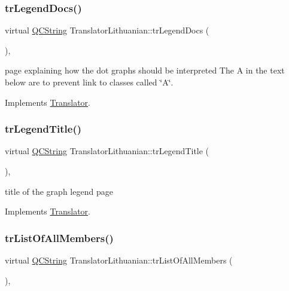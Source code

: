 \subsubsection{\texorpdfstring{trLegendDocs()}{trLegendDocs()}}
{\footnotesize\ttfamily virtual \mbox{\hyperlink{class_q_c_string}{Q\+C\+String}} Translator\+Lithuanian\+::tr\+Legend\+Docs (\begin{DoxyParamCaption}{ }\end{DoxyParamCaption})\hspace{0.3cm}{\ttfamily [inline]}, {\ttfamily [virtual]}}

page explaining how the dot graph\textquotesingle{}s should be interpreted The A in the text below are to prevent link to classes called \char`\"{}\+A\char`\"{}. 

Implements \mbox{\hyperlink{class_translator}{Translator}}.

\mbox{\label{class_translator_lithuanian_a9fdf1e89968a9b5c9158e62e980e7681}} 
\subsubsection{\texorpdfstring{trLegendTitle()}{trLegendTitle()}}
{\footnotesize\ttfamily virtual \mbox{\hyperlink{class_q_c_string}{Q\+C\+String}} Translator\+Lithuanian\+::tr\+Legend\+Title (\begin{DoxyParamCaption}{ }\end{DoxyParamCaption})\hspace{0.3cm}{\ttfamily [inline]}, {\ttfamily [virtual]}}

title of the graph legend page 

Implements \mbox{\hyperlink{class_translator}{Translator}}.

\mbox{\label{class_translator_lithuanian_a27c8c56e64c97b37735438e311d4f513}} 
\subsubsection{\texorpdfstring{trListOfAllMembers()}{trListOfAllMembers()}}
{\footnotesize\ttfamily virtual \mbox{\hyperlink{class_q_c_string}{Q\+C\+String}} Translator\+Lithuanian\+::tr\+List\+Of\+All\+Members (\begin{DoxyParamCaption}{ }\end{DoxyParamCaption})\hspace{0.3cm}{\ttfamily [inline]}, {\ttfamily [virtual]}}


